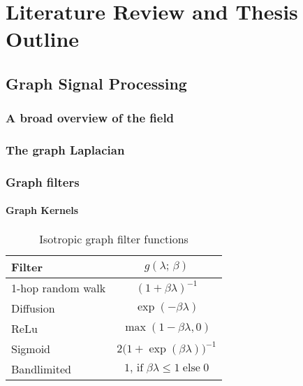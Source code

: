 \chapter{Literature Review and Thesis Outline} %

\label{chap:outline} %



\section{Graph Signal Processing}


\subsection{A broad overview of the field}


\subsection{The graph Laplacian}

\cite{LeMagoarou2016}


\subsection{Graph filters}

\subsubsection{Graph Kernels}


\begin{table}[b]
    \renewcommand{\arraystretch}{1.7}
    \small
    \begin{center}
    \begin{tabular}{|l|c|}
    \hline
    \textbf{Filter}   & $g(\lambda; \,\beta)$    \\ 
    \hline
    1-hop random walk & $(1 + \beta \lambda)^{-1}$ \\
    \hline
    Diffusion         & $\exp(-\beta \lambda)$       \\
    \hline
    ReLu              & $\max (1 - \beta \lambda, 0)$  \\
    \hline
    Sigmoid           & $2 \big( 1 + \exp(\beta \lambda)\big)^{-1}$ \\
    \hline
    Bandlimited       & $1, \,\text{if} \; \beta \lambda \leq 1 \; \text{else} \; 0$   \\
    \hline
    \end{tabular}
    \end{center}
    \caption{Isotropic graph filter functions}
    \label{tab:iso_filters}
    \end{table}



